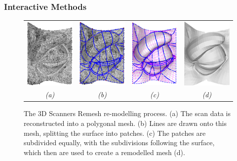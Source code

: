 \subsubsection{\label{sec:scandata:creation:control:interactive}Interactive Methods}
\begin{figure}
\begin{center}
\begin{tabular}{cccc}
\includegraphics[width=3.18cm]{../images/eye_dense} &
\includegraphics[width=3.18cm]{../images/eye_polylines} &
\includegraphics[width=3.18cm]{../images/eye_generate} &
\includegraphics[width=3.18cm]{../images/eye_remesh} \\
{\it(a)} & {\it(b)} & {\it(c)} & {\it(d)}
\end{tabular}
\caption[The 3D Scanners Remesh re-modelling process]{\label{fig:remesh}The 3D Scanners Remesh re-modelling process. (a) The scan data is reconstructed into a polygonal mesh. (b) Lines are drawn onto this mesh, splitting the surface into patches. (c) The patches are subdivided equally, with the subdivisions following the surface, which then are used to create a remodelled mesh (d).}
\end{center}
\end{figure}
